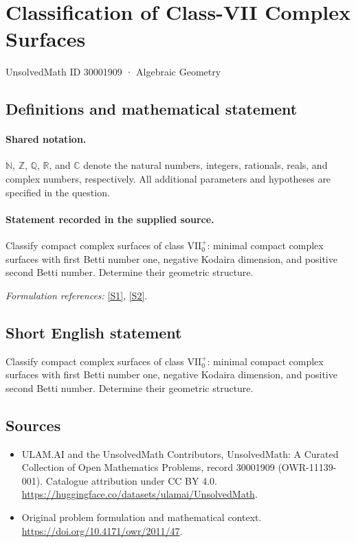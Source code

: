 \documentclass[11pt]{article}
\newcommand{\sref}[2]{\hyperlink{source:#1:#2}{[S#2]}}
\begin{document}
\setcounter{section}{30001908}
\section{Classification of Class-VII Complex Surfaces}\label{30001909}
{\small UnsolvedMath ID 30001909 · Algebraic Geometry}
\subsection{Definitions and mathematical statement}

\paragraph{Shared notation.}$\mathbb N$, $\mathbb Z$, $\mathbb Q$, $\mathbb R$, and $\mathbb C$ denote the natural numbers, integers, rationals, reals, and complex numbers, respectively. All additional parameters and hypotheses are specified in the question.


\paragraph{Statement recorded in the supplied source.}
Classify compact complex surfaces of class $\mathrm{VII}_0^+$: minimal compact complex surfaces with first Betti number one, negative Kodaira dimension, and positive second Betti number. Determine their geometric structure.
\par\smallskip\textit{Formulation references:} \sref{30001909}{1}, \sref{30001909}{2}.
\subsection{Short English statement}
Classify compact complex surfaces of class $\mathrm{VII}_0^+$: minimal compact complex surfaces with first Betti number one, negative Kodaira dimension, and positive second Betti number. Determine their geometric structure.
\subsection{Sources}
\begin{itemize}
\item[\hypertarget{source:30001909:1}{S1}] ULAM.AI and the UnsolvedMath Contributors, UnsolvedMath: A Curated Collection of Open Mathematics Problems, record 30001909 (OWR-11139-001). Catalogue attribution under CC BY 4.0.
\url{https://huggingface.co/datasets/ulamai/UnsolvedMath}.
\item[\hypertarget{source:30001909:2}{S2}] Original problem formulation and mathematical context.
\url{https://doi.org/10.4171/owr/2011/47}.
\end{itemize}
\label{end:30001909}
\end{document}
